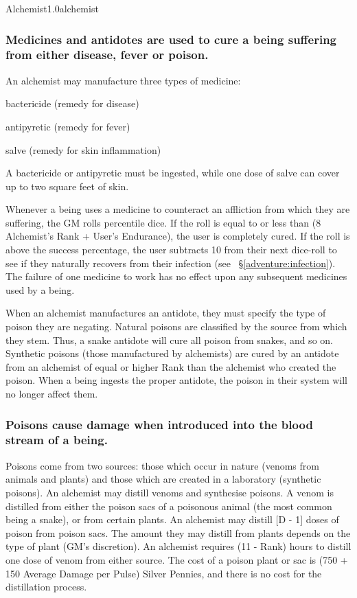 \begin{skill}{Alchemist}{1.0}{alchemist}
\subsubsection{Medicines and antidotes are used to cure a being
suffering from either disease, fever or poison.}


An alchemist may manufacture three types of medicine:
\begin{Itemize}
\item bactericide (remedy for disease)
\item antipyretic (remedy for fever)
\item salve (remedy for skin inflammation)
\end{Itemize}
A bactericide or antipyretic must be ingested, while one dose of salve
can cover up to two square feet of skin.

Whenever a being uses a medicine to counteract an affliction from
which they are suffering, the GM rolls percentile dice.  If the roll
is equal to or less than (8 \x Alchemist's Rank + User's Endurance),
the user is completely cured.  If the roll is above the success
percentage, the user subtracts 10 from their next dice-roll to see if
they naturally recovers from their infection (see
~\S\ref{adventure:infection}).  The failure of one medicine to work
has no effect upon any subsequent medicines used by a being.

When an alchemist manufactures an antidote, they must specify the type
of poison they are negating.  Natural poisons are classified by the
source from which they stem.  Thus, a snake antidote will cure all
poison from snakes, and so on.  Synthetic poisons (those manufactured
by alchemists) are cured by an antidote from an alchemist of equal or
higher Rank than the alchemist who created the poison.  When a being
ingests the proper antidote, the poison in their system will no longer
affect them.

\subsubsection{Poisons cause damage when introduced into the blood
stream of a being.}
\label{alchemist:poisons}

Poisons come from two sources: those which occur in nature (venoms
from animals and plants) and those which are created in a laboratory
(synthetic poisons).  An alchemist may distill venoms and synthesise
poisons.  A venom is distilled from either the poison sacs of a
poisonous animal (the most common being a snake), or from certain
plants.  An alchemist may distill [D - 1] doses of poison from poison
sacs.  The amount they may distill from plants depends on the type of
plant (GM's discretion).  An alchemist requires (11 - Rank) hours to
distill one dose of venom from either source.  The cost of a poison
plant or sac is (750 + 150 \x Average Damage per Pulse) Silver
Pennies, and there is no cost for the distillation process.


\end{skill}
